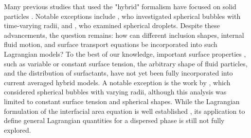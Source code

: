 
Many previous studies that used the "hybrid" formalism have focused on solid particles \citep{buyevich1979flow,jackson1997locally}. 
Notable exceptions include \citet{zhang1994ensemble}, who investigated spherical bubbles with time-varying radii, and \citet{zhang1997momentum}, who examined spherical droplets. 
Despite these advancements, the question remains: how can different inclusion shapes, internal fluid motion, and surface transport equations be incorporated into such Lagrangian models? 
To the best of our knowledge, important surface properties , such as variable or constant surface tension, the arbitrary shape of fluid particles, and the distribution of surfactants, have not yet been fully incorporated into current averaged hybrid models. 
A notable exception is the work by \citep{zhang1994ensemble}, which considered spherical bubbles with varying radii, although this analysis was limited to constant surface tension and spherical shapes. 
While the Lagrangian formulation of the interfacial area equation is well established \citep{lhuillier2000bilan}, its application to define general Lagrangian quantities for a dispersed phase is still not fully explored. 


